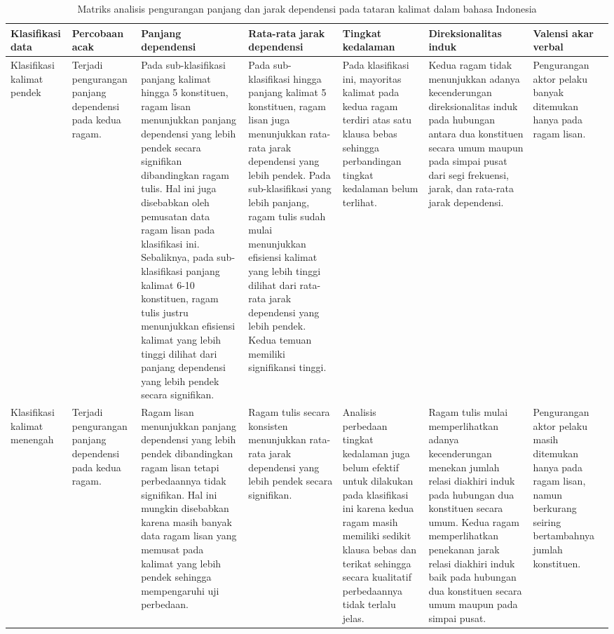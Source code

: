 \begin{landscape}
\begin{table}[htbp]
\caption{Matriks analisis pengurangan panjang dan jarak dependensi pada tataran kalimat dalam bahasa Indonesia}\label{tab:matriksanalisis}
\begin{scriptsize}
\begin{center}
\begin{tabular}{| p{1.3cm} | p{2.4cm} | p{4cm} | p{3.5cm} | p{4cm} | p{3cm} | p{2.3cm} | }
\hline
Klasifikasi data & Percobaan acak & Panjang dependensi & Rata-rata jarak dependensi & Tingkat kedalaman & Direksionalitas induk & Valensi akar verbal\\ \hline
Klasifikasi kalimat pendek & Terjadi pengurangan panjang dependensi pada kedua ragam. & Pada sub-klasifikasi panjang kalimat hingga 5 konstituen, ragam lisan menunjukkan panjang dependensi yang lebih pendek secara signifikan dibandingkan ragam tulis. Hal ini juga disebabkan oleh pemusatan data ragam lisan pada klasifikasi ini. Sebaliknya, pada sub-klasifikasi panjang kalimat 6-10 konstituen, ragam tulis justru menunjukkan efisiensi kalimat yang lebih tinggi dilihat dari panjang dependensi yang lebih pendek secara signifikan. & Pada sub-klasifikasi hingga panjang kalimat 5 konstituen, ragam lisan juga menunjukkan rata-rata jarak dependensi yang lebih pendek. Pada sub-klasifikasi yang lebih panjang, ragam tulis sudah mulai menunjukkan efisiensi kalimat yang lebih tinggi dilihat dari rata-rata jarak dependensi yang lebih pendek. Kedua temuan memiliki signifikansi tinggi. & Pada klasifikasi ini, mayoritas kalimat pada kedua ragam terdiri atas satu klausa bebas sehingga perbandingan tingkat kedalaman belum terlihat. & Kedua ragam tidak menunjukkan adanya kecenderungan direksionalitas induk pada hubungan antara dua konstituen secara umum maupun pada simpai pusat dari segi frekuensi, jarak, dan rata-rata jarak dependensi. & Pengurangan aktor pelaku banyak ditemukan hanya pada ragam lisan. \\ \hline
Klasifikasi kalimat menengah & Terjadi pengurangan panjang dependensi pada kedua ragam. & Ragam lisan menunjukkan panjang dependensi yang lebih pendek dibandingkan ragam lisan tetapi perbedaannya tidak signifikan. Hal ini mungkin disebabkan karena masih banyak data ragam lisan yang memusat pada kalimat yang lebih pendek sehingga mempengaruhi uji perbedaan. & Ragam tulis secara konsisten menunjukkan rata-rata jarak dependensi yang lebih pendek secara signifikan. & Analisis perbedaan tingkat kedalaman juga belum efektif untuk dilakukan pada klasifikasi ini karena kedua ragam masih memiliki sedikit klausa bebas dan terikat sehingga secara kualitatif perbedaannya tidak terlalu jelas. & Ragam tulis mulai memperlihatkan adanya kecenderungan menekan jumlah relasi diakhiri induk pada hubungan dua konstituen secara umum. Kedua ragam memperlihatkan penekanan jarak relasi diakhiri induk baik pada hubungan dua konstituen secara umum maupun pada simpai pusat. & Pengurangan aktor pelaku masih ditemukan hanya pada ragam lisan, namun berkurang seiring bertambahnya jumlah konstituen. \\ \hline

\end{tabular}
\end{center}
\end{scriptsize}
\end{table}
\end{landscape}
